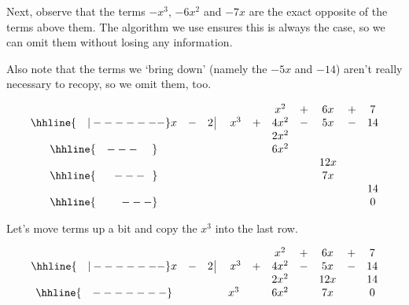 \setlength\arraycolsep{5pt}
\setlength\extrarowheight{0pt}


Next, observe that the terms $-x^3$, $-6x^2$ and $-7x$ are the exact opposite of the terms above them.  The algorithm we use ensures this is always the case, so we can omit them without losing any information.

\medskip

 Also note that the terms we `bring down' (namely the $-5x$ and $-14$) aren't really necessary to recopy, so we omit them, too.


\setlength\arraycolsep{0.1pt}
\setlength\extrarowheight{2pt}

\[ \begin{array}{cccccccccc}

& & & & & x^2 & + & 6x & + & 7 \\ \hhline{~~~|-------}

x & - & 2 \, \vline& \, \, x^3 & + & 4x^2 & - & 5x & - & 14 \\

 &  &  &   &  &   2x^2 &  &  &  &  \\ \hhline{~~~---~~~~} 
 &  &  &   &  & 6 x^2 &  &  &  &  \\ 
 &  &  &   & &  &  &  12x &  &  \\ \hhline{~~~~~---~~} 
 &  &  &   &   &  & & 7x  &  &  \\
 &  &  &   &   &  & &   &  &  14  \\ \hhline{~~~~~~~---} 
 &   &  &  &  &  &  &  &  & 0
 
\end{array}\]

\setlength\arraycolsep{5pt}
\setlength\extrarowheight{0pt}

Let's move terms up a bit and copy the $x^3$ into the last row.


\setlength\arraycolsep{0.1pt}
\setlength\extrarowheight{2pt}

\[ \begin{array}{cccccccccc}

& & & & & x^2 & + & 6x & + & 7 \\ \hhline{~~~|-------}

x & - & 2 \, \vline& \, \, x^3 & + & 4x^2 & - & 5x & - & 14 \\

 &  &  &   & &   2x^2 &  & 12x &  & 14 \\ \hhline{~~~-------} 
 &  &  & x^3  &  & 6 x^2 &  & 7x &  &0  \\  
\end{array}\]

